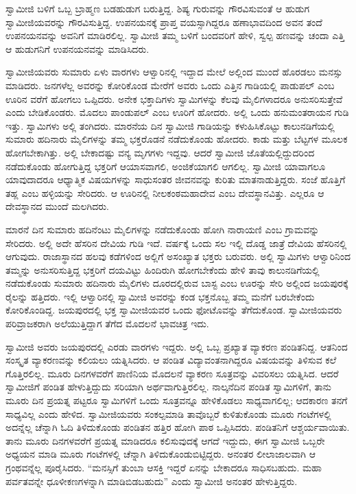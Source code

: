  ಸ್ವಾಮೀಜಿ ಬಳಿಗೆ ಒಬ್ಬ ಬ್ರಾಹ್ಮಣ ಬಡಹುಡುಗ ಬರುತ್ತಿದ್ದ. ಶಿಷ್ಯ ಗುರುವನ್ನು ಗೌರವಿಸುವಂತೆ ಆ ಹುಡುಗ ಸ್ವಾಮೀಜಿಯವರನ್ನು ಗೌರವಿಸುತ್ತಿದ್ದ. ಉಪನಯನಕ್ಕೆ ಪ್ರಾಪ್ತ ವಯಸ್ಸಾಗಿದ್ದರೂ ಹಣಾಭಾವದಿಂದ ಅವನ ತಂದೆ ಉಪನಯನವನ್ನು ಅವನಿಗೆ ಮಾಡಿರಲಿಲ್ಲ. ಸ್ವಾಮೀಜಿ ತಮ್ಮ ಬಳಿಗೆ ಬಂದವರಿಗೆ ಹೇಳಿ, ಸ್ವಲ್ಪ ಹಣವನ್ನು ಚಂದಾ ಎತ್ತಿ ಆ ಹುಡುಗನಿಗೆ ಉಪನಯನವನ್ನು ಮಾಡಿಸಿದರು. 

 ಸ್ವಾಮೀಜಿಯವರು ಸುಮಾರು ಏಳು ವಾರಗಳು ಆಳ್ವಾರಿನಲ್ಲಿ ಇದ್ದಾದ ಮೇಲೆ ಅಲ್ಲಿಂದ ಮುಂದೆ ಹೊರಡಲು ಮನಸ್ಸು ಮಾಡಿದರು. ಜನಗಳೆಲ್ಲ ಅವರನ್ನು ಕೋರಿಕೊಂಡ ಮೇರೆಗೆ ಅವರು ಒಂದು ಎತ್ತಿನ ಗಾಡಿಯಲ್ಲಿ ಪಾಡುಪಲ್ ಎಂಬ ಊರಿನ ವರೆಗೆ ಹೋಗಲು ಒಪ್ಪಿದರು. ಅನೇಕ ಭಕ್ತಾದಿಗಳು ಸ್ವಾಮಿಗಳನ್ನು ಕೆಲವು ಮೈಲಿಗಳಾದರೂ ಅನುಸರಿಸುತ್ತೇವೆ ಎಂದು ಬೇಡಿಕೊಂಡರು. ಮೊದಲು ಪಾಂಡುಪಲ್ ಎಂಬ ಊರಿಗೆ ಹೋದರು. ಅಲ್ಲಿ ಒಂದು ಹನುಮಂತರಾಯನ ಗುಡಿ ಇತ್ತು. ಸ್ವಾಮಿಗಳು ಅಲ್ಲಿ ತಂಗಿದರು. ಮಾರನೆಯ ದಿನ ಸ್ವಾಮೀಜಿ ಗಾಡಿಯನ್ನು ಕಳುಹಿಸಿಕೊಟ್ಟು ಕಾಲುನಡಿಗೆಯಲ್ಲಿ ಸುಮಾರು ಹದಿನಾರು ಮೈಲಿಗಳನ್ನು ತಮ್ಮ ಭಕ್ತರೊಡನೆ ನಡೆದುಕೊಂಡು ಹೋದರು. ಕಾಡು ಮತ್ತು ಬೆಟ್ಟಗಳ ಮೂಲಕ ಹೋಗಬೇಕಾಗಿತ್ತು. ಅಲ್ಲಿ ಬೇಕಾದಷ್ಟು ವನ್ಯ ಮೃಗಗಳು ಇದ್ದವು. ಆದರೆ ಸ್ವಾಮೀಜಿ ಜೊತೆಯಲ್ಲಿದ್ದುದರಿಂದ ನಡೆದುಕೊಂಡು ಹೋಗುತ್ತಿದ್ದ ಭಕ್ತರಿಗೆ ಆಯಾಸವಾಗಲಿ, ಅಂಜಿಕೆಯಾಗಲಿ ಆಗಲಿಲ್ಲ. ಸ್ವಾಮೀಜಿ ಯಾವಾಗಲೂ ಯಾವುದಾದರೂ ಆಧ್ಯಾತ್ಮಿಕ ವಿಷಯಗಳನ್ನು ಸಾಧುಸಂತರ ಜೀವನವನ್ನು ಕುರಿತು ಮಾತನಾಡುತ್ತಿದ್ದರು. ಸಂಜೆ ಹೊತ್ತಿಗೆ ತಹ್ಲ ಎಂಬ ಹಳ್ಳಿಯನ್ನು ಸೇರಿದರು. ಆ ಊರಿನಲ್ಲಿ ನೀಲಕಂಠಮಹಾದೇವ ಎಂಬ ದೇವಸ್ಥಾನವಿತ್ತು. ಎಲ್ಲರೂ ಆ ದೇವಸ್ಥಾನದ ಮುಂದೆ ಮಲಗಿದರು. 

 ಮಾರನೆ ದಿನ ಸುಮಾರು ಹದಿನೆಂಟು ಮೈಲಿಗಳನ್ನು ನಡೆದುಕೊಂಡು ಹೋಗಿ ನಾರಾಯಣಿ ಎಂಬ ಗ್ರಾಮವನ್ನು ಸೇರಿದರು. ಅಲ್ಲಿ ಅದೇ ಹೆಸರಿನ ದೇವಿಯ ಗುಡಿ ಇದೆ. ವರ್ಷಕ್ಕೆ ಒಂದು ಸಲ ಇಲ್ಲಿ ದೊಡ್ಡ ಜಾತ್ರೆ ದೇವಿಯ ಹೆಸರಿನಲ್ಲಿ ಆಗುವುದು. ರಾಜಾಸ್ಥಾನದ ಹಲವು ಕಡೆಗಳಿಂದ ಅಲ್ಲಿಗೆ ಅಸಂಖ್ಯಾತ ಭಕ್ತರು ಬರುವರು. ಅಲ್ಲಿ ಸ್ವಾಮಿಗಳು ಆಳ್ವಾರಿನಿಂದ ತಮ್ಮನ್ನು ಅನುಸರಿಸುತ್ತಿದ್ದ ಭಕ್ತರಿಗೆ ದಯವಿಟ್ಟು ಹಿಂದಿರುಗಿ ಹೋಗಬೇಕೆಂದು ಹೇಳಿ ತಾವು ಕಾಲುನಡಿಗೆಯಲ್ಲಿ ನಡೆದುಕೊಂಡು ಸುಮಾರು ಹದಿನಾರು ಮೈಲಿಗಳು ದೂರದಲ್ಲಿರುವ ಬಾಸ್ಟ ಎಂಬ ಊರನ್ನು ಸೇರಿ ಅಲ್ಲಿಂದ ಜಯಪುರಕ್ಕೆ ರೈಲನ್ನು ಹತ್ತಿದರು. ಇಲ್ಲಿ ಆಳ್ವಾರಿನಲ್ಲಿ ಸ್ವಾಮೀಜಿ ಅವರನ್ನು ಕಂಡ ಭಕ್ತನೊಬ್ಬ ತಮ್ಮ ಮನೆಗೆ ಬರಬೇಕೆಂದು ಕೋರಿಕೊಂಡಿದ್ದ. ಜಯಪುರದಲ್ಲಿ ಭಕ್ತ ಸ್ವಾಮೀಜಿಯವರ ಒಂದು ಫೋಟೊವನ್ನು ತೆಗೆದುಕೊಂಡ. ಸ್ವಾಮೀಜಿಯವರು ಪರಿವ್ರಾಜಕರಾಗಿ ಅಲೆಯುತ್ತಿದ್ದಾಗ ತೆಗೆದ ಮೊದಲನೆ ಭಾವಚಿತ್ರ ಇದು. 

 ಸ್ವಾಮೀಜಿ ಅವರು ಜಯಪುರದಲ್ಲಿ ಎರಡು ವಾರಗಳು ಇದ್ದರು. ಅಲ್ಲಿ ಒಬ್ಬ ಪ್ರಖ್ಯಾತ ವ್ಯಾಕರಣ ಪಂಡಿತನಿದ್ದ. ಆತನಿಂದ ಸಂಸ್ಕೃತ ವ್ಯಾಕರಣವನ್ನು ಕಲಿಯಲು ಯತ್ನಿಸಿದರು. ಆ ಪಂಡಿತ ವಿದ್ಯಾವಂತನಾಗಿದ್ದರೂ ವಿಷಯವನ್ನು ತಿಳಿಸುವ ಕಲೆ ಗೊತ್ತಿರಲಿಲ್ಲ. ಮೂರು ದಿನಗಳವರೆಗೆ ಪಾಣಿನಿಯ ಮೊದಲನೆ ವ್ಯಾಕರಣ ಸೂತ್ರವನ್ನು ವಿವರಿಸಲು ಯತ್ನಿಸಿದ. ಆದರೆ ಸ್ವಾಮೀಜಿಗೆ ಪಂಡಿತ ಹೇಳುತ್ತಿದ್ದುದು ಸರಿಯಾಗಿ ಅರ್ಥವಾಗುತ್ತಿರಲಿಲ್ಲ. ನಾಲ್ಕನೆದಿನ ಪಂಡಿತ ಸ್ವಾಮಿಗಳಿಗೆ, ತಾನು ಮೂರು ದಿನ ಪ್ರಯತ್ನ ಪಟ್ಟರೂ ಸ್ವಾಮಿಗಳಿಗೆ ಒಂದು ಸೂತ್ರವನ್ನೂ ಹೇಳಿಕೊಡಲು ಸಾಧ್ಯವಾಗಲಿಲ್ಲ; ಆದಕಾರಣ ತನಗೆ ಸಾಧ್ಯವಿಲ್ಲ ಎಂದು ಹೇಳಿದ. ಸ್ವಾಮೀಜಿಯವರು ಸಂಕಲ್ಪಮಾಡಿ ತಾವೊಬ್ಬರೆ ಕುಳಿತುಕೊಂಡು ಮೂರು ಗಂಟೆಗಳಲ್ಲಿ ಅದನ್ನೆಲ್ಲ ಚೆನ್ನಾಗಿ ಓದಿ ತಿಳಿದುಕೊಂಡು ಪಂಡಿತನ ಹತ್ತಿರ ಹೋಗಿ ಪಾಠ ಒಪ್ಪಿಸಿದರು. ಪಂಡಿತನಿಗೆ ಆಶ್ಚರ್ಯವಾಯಿತು. ತಾನು ಮೂರು ದಿನಗಳವರೆಗೆ ಪ್ರಯತ್ನ ಮಾಡಿದರೂ ಕಲಿಸುವುದಕ್ಕೆ ಆಗದೆ ಇದ್ದುದು, ಈಗ ಸ್ವಾಮೀಜಿ ಒಬ್ಬರೇ ಅಧ್ಯಯನ ಮಾಡಿ ಮೂರು ಗಂಟೆಗಳಲ್ಲಿ ಚೆನ್ನಾಗಿ ತಿಳಿದುಕೊಂಡುಬಿಟ್ಟಿದ್ದರು. ಅನಂತರ ಲೀಲಾಜಾಲವಾಗಿ ಆ ಗ್ರಂಥವನ್ನೆಲ್ಲ ಪೂರೈಸಿದರು. “ಮನಸ್ಸಿಗೆ ತುಂಬಾ ಆಸಕ್ತಿ ಇದ್ದರೆ ಏನನ್ನು ಬೇಕಾದರೂ ಸಾಧಿಸಬಹುದು. ಮಹಾ ಪರ್ವತವನ್ನೇ ಧೂಳೀಕಣಗಳನ್ನಾಗಿ ಮಾಡಿಬಿಡಬಹುದು” ಎಂದು ಸ್ವಾಮೀಜಿ ಅನಂತರ ಹೇಳುತ್ತಿದ್ದರು. 

